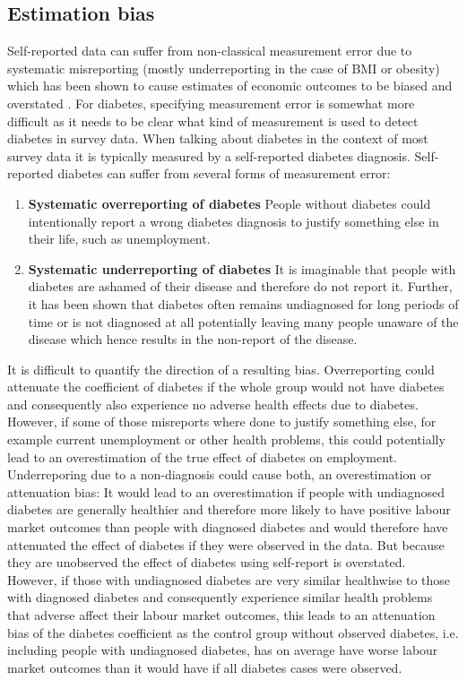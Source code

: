 \subsection{Estimation bias}

Self-reported data can suffer from non-classical measurement
error due to systematic misreporting (mostly underreporting in the
case of \ac{BMI} or obesity) which has been shown to cause estimates
of economic outcomes to be biased and overstated \citep{Cawley2015,ONeill2013,Perks2015}.
For diabetes, specifying measurement error is somewhat more difficult
as it needs to be clear what kind of measurement is used to detect
diabetes in survey data.
When talking about diabetes in the context of most survey data it
is typically measured by a self-reported diabetes diagnosis. Self-reported diabetes can suffer from several forms of measurement error:
\begin{enumerate}
\item \textbf{Systematic overreporting of diabetes}
People without diabetes could intentionally report a wrong diabetes diagnosis to justify something else in their life, such as unemployment.
\item \textbf{Systematic underreporting of diabetes}
It is imaginable that people with diabetes are ashamed of their disease and therefore do not report it. Further, it has been shown that diabetes often remains undiagnosed for long periods of time or is not diagnosed at all potentially leaving many people unaware of the disease which hence results in the non-report of the disease.
\end{enumerate}
It is difficult to quantify the direction of a resulting bias. Overreporting could attenuate the coefficient of diabetes if the whole group would not have diabetes and
consequently also experience no adverse health effects due to diabetes.
However, if some of those misreports where done to
justify something else, for example current unemployment or other health problems,
this could potentially lead to an overestimation of the true effect
of diabetes on employment. Underreporing due to a non-diagnosis could cause both, an overestimation or attenuation bias: It would lead to an overestimation if people with undiagnosed diabetes are generally healthier and therefore more likely to have positive labour market outcomes than people with diagnosed diabetes and would therefore have attenuated the effect of diabetes if they were observed in the data. But because they are unobserved the effect of diabetes using self-report is overstated. However, if those with undiagnosed diabetes are very similar healthwise to those with diagnosed diabetes and consequently experience similar health problems that adverse affect their labour market outcomes, this leads to an attenuation bias of the diabetes coefficient as the control group without observed diabetes, i.e. including people with undiagnosed diabetes, has on average have worse labour market outcomes than it would have if all diabetes cases were observed.

